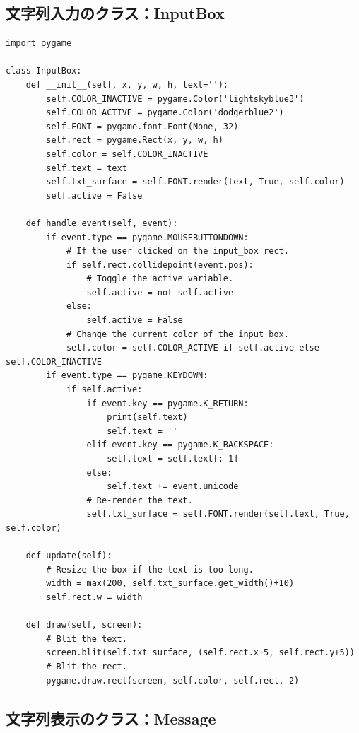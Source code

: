 \documentclass[uplatex,a4paper,11pt,oneside,openany]{jsbook}
\begin{document}

\subsection{文字列入力のクラス：InputBox}

\begin{lstlisting}[caption=class InputBox,label=pr08]
import pygame

class InputBox:
    def __init__(self, x, y, w, h, text=''):
        self.COLOR_INACTIVE = pygame.Color('lightskyblue3')
        self.COLOR_ACTIVE = pygame.Color('dodgerblue2')
        self.FONT = pygame.font.Font(None, 32)
        self.rect = pygame.Rect(x, y, w, h)
        self.color = self.COLOR_INACTIVE
        self.text = text
        self.txt_surface = self.FONT.render(text, True, self.color)
        self.active = False

    def handle_event(self, event):
        if event.type == pygame.MOUSEBUTTONDOWN:
            # If the user clicked on the input_box rect.
            if self.rect.collidepoint(event.pos):
                # Toggle the active variable.
                self.active = not self.active
            else:
                self.active = False
            # Change the current color of the input box.
            self.color = self.COLOR_ACTIVE if self.active else self.COLOR_INACTIVE
        if event.type == pygame.KEYDOWN:
            if self.active:
                if event.key == pygame.K_RETURN:
                    print(self.text)
                    self.text = ''
                elif event.key == pygame.K_BACKSPACE:
                    self.text = self.text[:-1]
                else:
                    self.text += event.unicode
                # Re-render the text.
                self.txt_surface = self.FONT.render(self.text, True, self.color)

    def update(self):
        # Resize the box if the text is too long.
        width = max(200, self.txt_surface.get_width()+10)
        self.rect.w = width

    def draw(self, screen):
        # Blit the text.
        screen.blit(self.txt_surface, (self.rect.x+5, self.rect.y+5))
        # Blit the rect.
        pygame.draw.rect(screen, self.color, self.rect, 2)
\end{lstlisting}

\subsection{文字列表示のクラス：Message}
\end{document}
